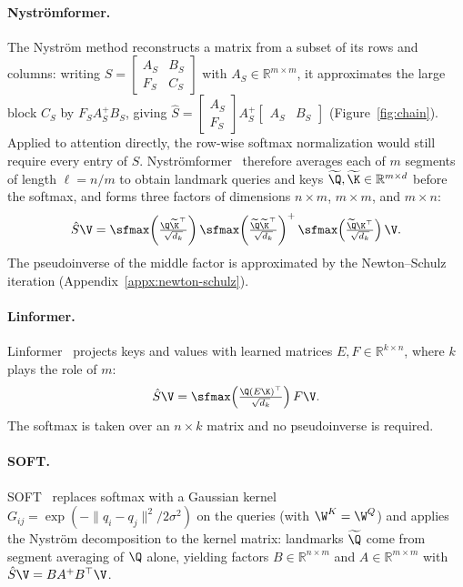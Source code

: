 \paragraph{Nystr\"omformer.}
The Nystr\"om method reconstructs a matrix from a subset of its rows and columns: writing $S = \begin{bmatrix} A_S & B_S \\ F_S & C_S \end{bmatrix}$ with $A_S \in \mathbb{R}^{m \times m}$, it approximates the large block $C_S$ by $F_S A_S^{+} B_S$, giving $\hat S = \begin{bmatrix} A_S \\ F_S \end{bmatrix} A_S^{+} \begin{bmatrix} A_S & B_S \end{bmatrix}$ (Figure~\ref{fig:chain}). Applied to attention directly, the row-wise softmax normalization would still require every entry of $S$. Nystr\"omformer~\cite{Nystromformer} therefore averages each of $m$ segments of length $\ell = n/m$ to obtain landmark queries and keys $\widetilde{\Q}, \widetilde{\K} \in \mathbb{R}^{m \times d}$ before the softmax, and forms three factors of dimensions $n \times m$, $m \times m$, and $m \times n$:
\[
\hat S \V =
\sfmax\!\left(\tfrac{\Q\widetilde{\K}^{\top}}{\sqrt{d_k}}\right)
\sfmax\!\left(\tfrac{\widetilde{\Q}\widetilde{\K}^{\top}}{\sqrt{d_k}}\right)^{+}
\sfmax\!\left(\tfrac{\widetilde{\Q}\K^{\top}}{\sqrt{d_k}}\right)\V .
\]
The pseudoinverse of the middle factor is approximated by the Newton--Schulz iteration (Appendix~\ref{appx:newton-schulz}).

\paragraph{Linformer.}
Linformer~\cite{Linformer} projects keys and values with learned matrices $E, F \in \mathbb{R}^{k \times n}$, where $k$ plays the role of $m$:
\[
\hat S \V = \sfmax\!\left(\tfrac{\Q(E\K)^{\top}}{\sqrt{d_k}}\right) F\V .
\]
The softmax is taken over an $n \times k$ matrix and no pseudoinverse is required.

\paragraph{SOFT.}
SOFT~\cite{SOFT} replaces softmax with a Gaussian kernel $G_{ij} = \exp(-\|q_i - q_j\|^2 / 2\sigma^2)$ on the queries (with $\W^K = \W^Q$) and applies the Nystr\"om decomposition to the kernel matrix: landmarks $\widetilde{\Q}$ come from segment averaging of $\Q$ alone, yielding factors $B \in \mathbb{R}^{n \times m}$ and $A \in \mathbb{R}^{m \times m}$ with $\hat S \V = B A^{+} B^{\top} \V$.

